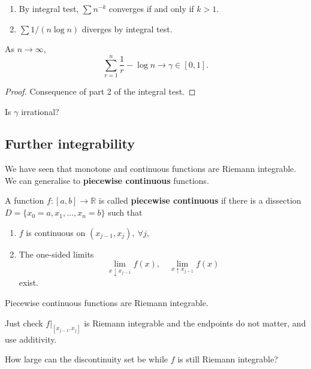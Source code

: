 \begin{example}
    \begin{enumerate}
        \item By integral test, $ \sum n^{-k} $ converges if and only if $k>1$.
        \item $ \sum 1/(n\log n) $ diverges by integral test.
    \end{enumerate}
\end{example}

\begin{corollary}
    As $ n\to \infty $, 
    \[
        \sum_{r=1}^{n}\frac{1}{r}-\log {n} \to \gamma\in [0,1].
    \]
\end{corollary}
\begin{proof}
    Consequence of part 2 of the integral test.
\end{proof}

\begin{sque}
    Is $ \gamma $ irrational?
\end{sque}

\subsection{Further integrability}
We have seen that monotone and continuous functions are Riemann integrable. We can generalise to \textbf{piecewise continuous} functions.
\begin{definition}
    A function $ f:[a,b]\to \mathbb{R} $ is called \textbf{piecewise continuous} if there is a dissection $ D=\{x_0=a,x_1,\dots,x_n=b\} $ such that 
    \begin{enumerate}
        \item $ f $ is continuous on $ (x_{j-1},x_j),\ \forall j $,
        \item The one-sided limits 
        \[
            \lim_{x \downarrow x_{j-1}} f(x),\quad \lim_{x \uparrow x_{j-1}} f(x)
        \]
        exist.
    \end{enumerate}
\end{definition}

\begin{exercise}
    Piecewise continuous functions are Riemann integrable.
\end{exercise}
Just check $ f|_{[x_{j-1},x_j]} $ is Riemann integrable and the endpoints do not matter, and use additivity.

\begin{sque}
    How large can the discontinuity set be while $f$ is still Riemann integrable?
\end{sque}

